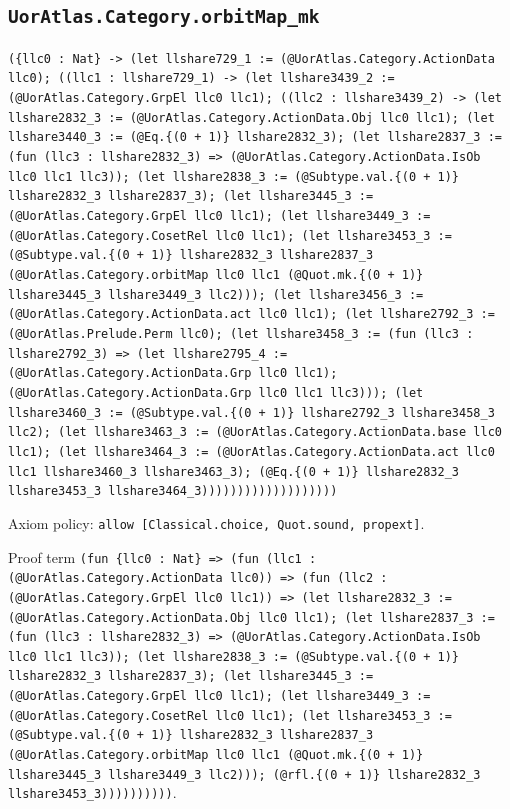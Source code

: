 \documentclass[11pt]{article}
\begin{document}
\subsection*{\texttt{UorAtlas.Category.orbitMap\_mk}}
\noindent\texttt{(\{llc0 : Nat\} -> (let llshare729\_1 := (@UorAtlas.Category.ActionData llc0); ((llc1 : llshare729\_1) -> (let llshare3439\_2 := (@UorAtlas.Category.GrpEl llc0 llc1); ((llc2 : llshare3439\_2) -> (let llshare2832\_3 := (@UorAtlas.Category.ActionData.Obj llc0 llc1); (let llshare3440\_3 := (@Eq.\{(0 + 1)\} llshare2832\_3); (let llshare2837\_3 := (fun (llc3 : llshare2832\_3) => (@UorAtlas.Category.ActionData.IsOb llc0 llc1 llc3)); (let llshare2838\_3 := (@Subtype.val.\{(0 + 1)\} llshare2832\_3 llshare2837\_3); (let llshare3445\_3 := (@UorAtlas.Category.GrpEl llc0 llc1); (let llshare3449\_3 := (@UorAtlas.Category.CosetRel llc0 llc1); (let llshare3453\_3 := (@Subtype.val.\{(0 + 1)\} llshare2832\_3 llshare2837\_3 (@UorAtlas.Category.orbitMap llc0 llc1 (@Quot.mk.\{(0 + 1)\} llshare3445\_3 llshare3449\_3 llc2))); (let llshare3456\_3 := (@UorAtlas.Category.ActionData.act llc0 llc1); (let llshare2792\_3 := (@UorAtlas.Prelude.Perm llc0); (let llshare3458\_3 := (fun (llc3 : llshare2792\_3) => (let llshare2795\_4 := (@UorAtlas.Category.ActionData.Grp llc0 llc1); (@UorAtlas.Category.ActionData.Grp llc0 llc1 llc3))); (let llshare3460\_3 := (@Subtype.val.\{(0 + 1)\} llshare2792\_3 llshare3458\_3 llc2); (let llshare3463\_3 := (@UorAtlas.Category.ActionData.base llc0 llc1); (let llshare3464\_3 := (@UorAtlas.Category.ActionData.act llc0 llc1 llshare3460\_3 llshare3463\_3); (@Eq.\{(0 + 1)\} llshare2832\_3 llshare3453\_3 llshare3464\_3)))))))))))))))))))}\par
\noindent Axiom policy: \texttt{allow [Classical.choice, Quot.sound, propext]}.\par
\noindent Proof term \texttt{(fun \{llc0 : Nat\} => (fun (llc1 : (@UorAtlas.Category.ActionData llc0)) => (fun (llc2 : (@UorAtlas.Category.GrpEl llc0 llc1)) => (let llshare2832\_3 := (@UorAtlas.Category.ActionData.Obj llc0 llc1); (let llshare2837\_3 := (fun (llc3 : llshare2832\_3) => (@UorAtlas.Category.ActionData.IsOb llc0 llc1 llc3)); (let llshare2838\_3 := (@Subtype.val.\{(0 + 1)\} llshare2832\_3 llshare2837\_3); (let llshare3445\_3 := (@UorAtlas.Category.GrpEl llc0 llc1); (let llshare3449\_3 := (@UorAtlas.Category.CosetRel llc0 llc1); (let llshare3453\_3 := (@Subtype.val.\{(0 + 1)\} llshare2832\_3 llshare2837\_3 (@UorAtlas.Category.orbitMap llc0 llc1 (@Quot.mk.\{(0 + 1)\} llshare3445\_3 llshare3449\_3 llc2))); (@rfl.\{(0 + 1)\} llshare2832\_3 llshare3453\_3))))))))))}.\par
\end{document}
